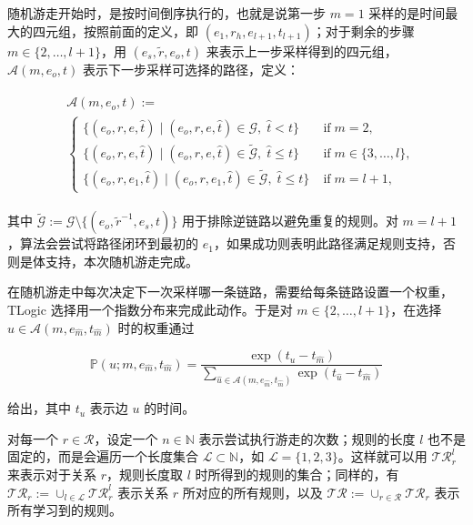 \documentclass[a4paper, AutoFakeBold]{article}
\begin{document}
随机游走开始时，是按时间倒序执行的，也就是说第一步 $m=1$ 采样的是时间最大的四元组，按照前面的定义，即 $(e_1,r_h,e_{l+1},t_{l+1})$；对于剩余的步骤 $m\in\{2,\dots,l+1\}$，用 $(e_s,{\tilde r},e_o,t)$ 来表示上一步采样得到的四元组，${\mathcal A}(m,e_o, t)$ 表示下一步采样可选择的路径，定义：

\begin{equation}
\begin{aligned}
	\begin{split}
		&\mathcal{A}(m, e_o, t) := \\
		&\begin{cases}
			\{(e_o, r, e, \hat{t}) \mid (e_o, r, e, \hat{t}) \in \mathcal{G},\; \hat{t} < t\} &\;\text{if}\; m = 2,\\
			\{(e_o, r, e, \hat{t}) \mid (e_o, r, e, \hat{t}) \in \tilde{\mathcal{G}},\; \hat{t} \leq t\} &\;\text{if}\; m \in \{3, \dots, l\},\\
			\{(e_o, r, e_1, \hat{t}) \mid (e_o, r, e_1, \hat{t}) \in \tilde{\mathcal{G}},\; \hat{t} \leq t\} &\;\text{if}\; m = l+1,
		\end{cases}
	\end{split}
\end{aligned}
\end{equation}

其中 $\tilde{\mathcal{G}} := \mathcal{G}\setminus \{(e_o, \tilde{r}^{-1}, e_s, t)\}$ 用于排除逆链路以避免重复的规则。对 $m=l+1$，算法会尝试将路径闭环到最初的 $e_1$，如果成功则表明此路径满足规则支持，否则是体支持，本次随机游走完成。

在随机游走中每次决定下一次采样哪一条链路，需要给每条链路设置一个权重，TLogic 选择用一个指数分布来完成此动作。于是对 $m \in \{2, \dots, l+1\}$，在选择 $u \in \mathcal{A}\left(m,e_{\hat{m}}, t_{\hat{m}}\right)$ 时的权重通过

\begin{equation}
	\mathbb{P}(u; m, e_{\hat{m}}, t_{\hat{m}}) = \frac{\exp(t_u - t_{\hat{m}})}{\sum\limits_{\hat{u} \in \mathcal{A}\left(m, e_{\hat{m}}, t_{\hat{m}}\right)}\exp(t_{\hat{u}} - t_{\hat{m}})}
\end{equation}


给出，其中 $t_u$ 表示边 $u$ 的时间。

对每一个 $r\in{\mathcal R}$，设定一个 $n\in{\mathbb N}$ 表示尝试执行游走的次数；规则的长度 $l$ 也不是固定的，而是会遍历一个长度集合 ${\mathcal L}\subset{\mathbb N}$，如 ${\mathcal L}=\{1,2,3\}$。这样就可以用 ${\mathcal {TR}}_r^l$ 来表示对于关系 $r$，规则长度取 $l$ 时所得到的规则的集合；同样的，有 $\mathcal{TR}_r := \cup_{l \in \mathcal{L}} \mathcal{TR}_r^l$ 表示关系 $r$ 所对应的所有规则，以及 $\mathcal{TR} := \cup_{r \in \mathcal{R}} \mathcal{TR}_r$ 表示所有学习到的规则。
\end{document}
